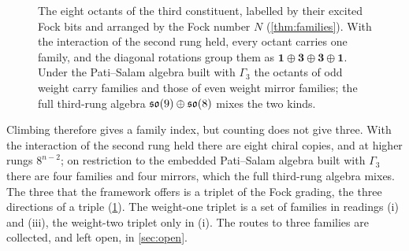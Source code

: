 \begin{figure}[t]
\centering
{}
\caption{The eight octants of the third constituent, labelled by their excited Fock bits and arranged by the Fock number $N$
(\cref{thm:families}). With the interaction of the second rung held, every octant carries one family, and the diagonal rotations group them
as $\mathbf1\oplus\mathbf3\oplus\mathbf3\oplus\mathbf1$. Under the Pati--Salam algebra built with $\Gamma_3$ the octants of odd weight carry
families and those of even weight mirror families; the full third-rung algebra $\mathfrak{so}(9)\oplus\mathfrak{so}(8)$ mixes the two kinds.}
\label{fig:octants}
\end{figure}

Climbing therefore gives a family index, but counting does not give three. With the interaction of the second rung held there are eight
chiral copies, and at higher rungs $8^{n-2}$; on restriction to the embedded Pati--Salam algebra built with $\Gamma_3$ there are four
families and four mirrors, which the full third-rung algebra mixes. The three that the framework offers is a triplet of the Fock grading,
the three directions of a triple (\cref{fig:octants}). The weight-one triplet is a set of families in readings (i) and (iii), the weight-two
triplet only in (i). The routes to three families are collected, and left open, in \cref{sec:open}.

